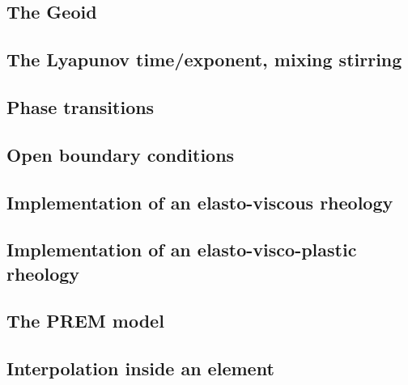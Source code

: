 \documentclass[a4paper]{article}
\begin{document}
\subsection{The Geoid} \label{ss:geoid}  %
\newpage %
\subsection{The Lyapunov time/exponent, mixing stirring}\label{ss:lyapunov} %
\newpage %
\subsection{Phase transitions}\label{ss:phasetransitions} %
\newpage %
\subsection{Open boundary conditions}\label{ss:openbc} %
\newpage %
\subsection{Implementation of an elasto-viscous rheology} \label{ss:evrheo}  %
\newpage %
\subsection{Implementation of an elasto-visco-plastic rheology}\label{ss:evprheo} %
\newpage %
\subsection{The PREM model} \label{ss:prem}  %
\newpage %
\subsection{Interpolation inside an element} \label{ss:bern}  %
\newpage %
\end{document}
